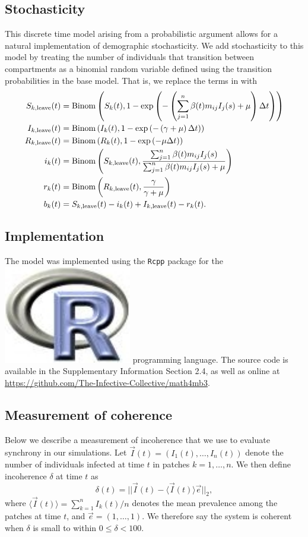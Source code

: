 \documentclass[12pt]{article}
\newcommand{\Rlogo}{\protect\includegraphics[height=2ex,keepaspectratio]{Rlogo.pdf}\xspace}
\begin{document}
\subsection{Stochasticity} \label{ss:stoch_model}
This discrete time model arising from a probabilistic argument allows for a natural implementation of demographic stochasticity. We add stochasticity to this model by treating the number of individuals that transition between compartments as a binomial random variable defined using the transition probabilities in the base model. That is, we replace the terms in  with
\begin{equation}
\label{eq:stochastic}
\begin{aligned}
S_{k, \tiny{\textrm{leave}}}(t) &= \mathrm{Binom}\left(S_k(t), 1 - \exp \left(-\left(\sum_{j=1}^n \beta(t) m_{ij} I_j(s) + \mu \right) \Delta t \right)\right)\\
I_{k, \tiny{\textrm{leave}}}(t) &= \mathrm{Binom}\left(I_k(t), 1 - \exp \left(-\left(\gamma + \mu \right) \Delta t \right)\right)\\
R_{k, \tiny{\textrm{leave}}}(t) &= \mathrm{Binom}\left(R_k(t), 1 - \exp \left(-\mu \Delta t \right)\right)\\
i_k(t) &= \mathrm{Binom}\left(S_{k, \tiny{\textrm{leave}}}(t), \frac{\sum_{j=1}^n \beta(t) m_{ij} I_j(s)}{\sum_{j=1}^n \beta(t) m_{ij} I_j(s) + \mu}\right)\\
r_k(t) &= \mathrm{Binom}\left(R_{k, \tiny{\textrm{leave}}}(t), \frac{\gamma}{\gamma + \mu}\right) \\
b_k(t) &= S_{k, \tiny{\textrm{leave}}}(t) - i_k(t) + I_{k, \tiny{\textrm{leave}}}(t) - r_k(t).
\end{aligned}
\end{equation}

\subsection{Implementation}
The model was implemented using the \texttt{Rcpp} package for the \Rlogo programming language. The source code is available in the Supplementary Information Section 2.4, as well as online at \url{https://github.com/The-Infective-Collective/math4mb3}.  

\subsection{Measurement of coherence}
\label{ss:measurement}
Below we describe a measurement of incoherence that we use to evaluate synchrony in our simulations. 
Let $\vec{I} (t) = (I_1(t), \dots, I_n(t))$ denote the number of individuals infected at time $t$ in patches $k = 1, \dots, n$. We then define incoherence $\delta$ at time $t$ as
$$
\delta(t) = || \vec{I}(t) - \langle \vec{I} (t) \rangle \vec{e}||_2,
$$
where $\langle \vec{I} (t) \rangle = \sum_{k=1}^n I_k(t) / n$ denotes the mean prevalence among the patches at time $t$, and $\vec{e} = (1, \dots, 1)$. We therefore say the system is coherent when $\delta$ is small to within $0 \leq \delta < 100$. 
\end{document}
